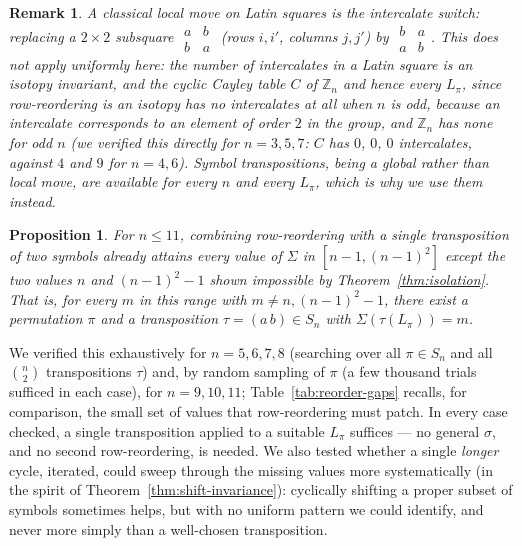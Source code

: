 \documentclass[11pt]{amsart}
\newtheorem{proposition}[theorem]{Proposition}
\newtheorem{remark}[theorem]{Remark}
\begin{document}
\begin{remark}\label{rem:no-intercalates}
A classical local move on Latin squares is the \emph{intercalate switch}: replacing a $2\times2$ subsquare $\begin{smallmatrix}a&b\\b&a\end{smallmatrix}$ (rows $i,i'$, columns $j,j'$) by $\begin{smallmatrix}b&a\\a&b\end{smallmatrix}$. This does not apply uniformly here: the number of intercalates in a Latin square is an isotopy invariant, and the cyclic Cayley table $C$ of $\mathbb Z_n$ and hence \emph{every} $L_\pi$, since row-reordering is an isotopy has no intercalates at all when $n$ is odd, because an intercalate corresponds to an element of order $2$ in the group, and $\mathbb Z_n$ has none for odd $n$ (we verified this directly for $n=3,5,7$: $C$ has $0$, $0$, $0$ intercalates, against $4$ and $9$ for $n=4,6$). Symbol transpositions, being a global rather than local move, are available for every $n$ and every $L_\pi$, which is why we use them instead.
\end{remark}

\begin{proposition}\label{prop:transposition}
For $n\le 11$, combining row-reordering with a single transposition of two symbols already attains every value of $\Sigma$ in $[n-1,(n-1)^2]$ \emph{except} the two values $n$ and $(n-1)^2-1$ shown impossible by Theorem~\ref{thm:isolation}. That is, for every $m$ in this range with $m\ne n,(n-1)^2-1$, there exist a permutation $\pi$ and a transposition $\tau=(a\,b)\in S_n$ with $\Sigma(\tau(L_\pi))=m$.
\end{proposition}

We verified this exhaustively for $n=5,6,7,8$ (searching over all $\pi\in S_n$ and all $\binom n2$ transpositions $\tau$) and, by random sampling of $\pi$ (a few thousand trials sufficed in each case), for $n=9,10,11$; Table~\ref{tab:reorder-gaps} recalls, for comparison, the small set of values that row-reordering must patch. In every case checked, a single transposition applied to a suitable $L_\pi$ suffices --- no general $\sigma$, and no second row-reordering, is needed. We also tested whether a single \emph{longer} cycle, iterated, could sweep through the missing values more systematically (in the spirit of Theorem~\ref{thm:shift-invariance}): cyclically shifting a proper subset of symbols sometimes helps, but with no uniform pattern we could identify, and never more simply than a well-chosen transposition.
\end{document}
